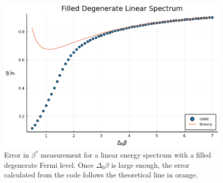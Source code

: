 \begin{figure}[H]
    \centering
    \includegraphics[scale=0.75]{figures/pdf/linE_filldegen_g0-2_N10.png}
    \caption{Error in $\beta^*$ measurement for a linear energy spectrum with a filled degenerate Fermi level. Once $\Delta_0\beta$ is large enough, the error calculated from the code follows the theoretical line in orange.}
    \label{fig:Filled}
\end{figure}

